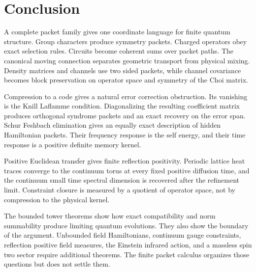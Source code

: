 \section{Conclusion}\label{strong:section:015}\label{strong:sec:conclusion}

A complete packet family gives one coordinate language for finite quantum structure. Group characters produce symmetry packets. Charged operators obey exact selection rules. Circuits become coherent sums over packet paths. The canonical moving connection separates geometric transport from physical mixing. Density matrices and channels use two sided packets, while channel covariance becomes block preservation on operator space and symmetry of the Choi matrix.

Compression to a code gives a natural error correction obstruction. Its vanishing is the Knill Laflamme condition. Diagonalizing the resulting coefficient matrix produces orthogonal syndrome packets and an exact recovery on the error span. Schur Feshbach elimination gives an equally exact description of hidden Hamiltonian packets. Their frequency response is the self energy, and their time response is a positive definite memory kernel.

Positive Euclidean transfer gives finite reflection positivity. Periodic lattice heat traces converge to the continuum torus at every fixed positive diffusion time, and the continuum small time spectral dimension is recovered after the refinement limit. Constraint closure is measured by a quotient of operator space, not by compression to the physical kernel.

The bounded tower theorems show how exact compatibility and norm summability produce limiting quantum evolutions. They also show the boundary of the argument. Unbounded field Hamiltonians, continuum gauge constraints, reflection positive field measures, the Einstein infrared action, and a massless spin two sector require additional theorems. The finite packet calculus organizes those questions but does not settle them.


